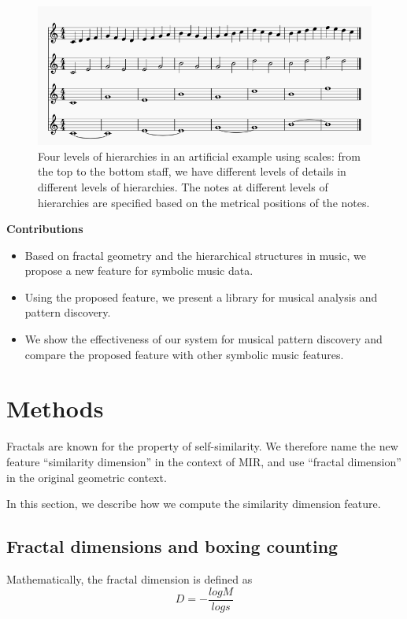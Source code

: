 \begin{figure}
  \includegraphics[width=\linewidth]{src/img/egscale.png}
  \caption{Four levels of hierarchies in an artificial example using scales: from the top to the bottom staff, we have different levels of details in different levels of hierarchies.
    The notes at different levels of hierarchies are specified based on the metrical positions of the notes.}
  \label{fig:egscale}
\end{figure}

\textbf{Contributions}
\begin{itemize}
\item  Based on fractal geometry and the hierarchical structures in music, we propose a new feature for symbolic music data.
\item  Using the proposed feature, we present a library for musical analysis and pattern discovery.
\item  We show the effectiveness of our system for musical pattern discovery and compare the proposed feature with other symbolic music features. 
\end{itemize}

\section{Methods}
Fractals are known for the property of self-similarity.
We therefore name the new feature ``similarity dimension'' in the context of MIR, and use ``fractal dimension'' in the original geometric context.

In this section, we describe how we compute the similarity dimension feature.

\subsection{Fractal dimensions and boxing counting}
Mathematically, the fractal dimension is defined as $$D=-\frac{logM}{logs}$$

